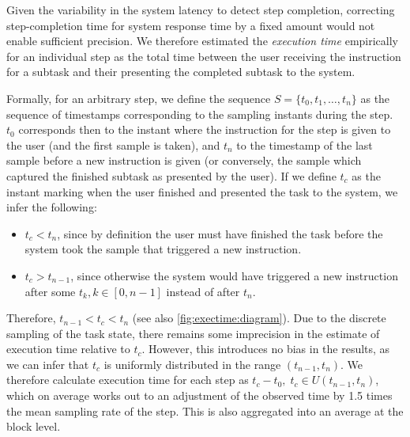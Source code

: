 \documentclass[10pt,letterpaper]{article}
\begin{document}
\begin{definition}

  Given the variability in the system latency to detect step completion, correcting step-completion time for system response time by a fixed amount would not enable sufficient precision.
  We therefore estimated the \emph{execution time} empirically for an individual step as the total time between the user receiving the instruction for a subtask and their presenting the completed subtask to the system.


  Formally, for an arbitrary step, we define the sequence \( S = \{ t_{0}, t_{1}, \ldots, t_{n} \} \) as the sequence of timestamps corresponding to the sampling instants during the step.
  \( t_{0} \) corresponds then to the instant where the instruction for the step is given to the user (and the first sample is taken), and \( t_{n} \) to the timestamp of the last sample before a new instruction is given (or conversely, the sample which captured the finished subtask as presented by the user).
  If we define \( t_{c} \) as the instant marking when the user finished and presented the task to the system, we infer the following:

  \begin{itemize}
    \item \( t_{c} < t_{n} \), since by definition the user must have finished the task before the system took the sample that triggered a new instruction.
    \item \( t_{c} > t_{n - 1} \), since otherwise the system would have triggered a new instruction after some \( t_{k}, k \in [0, n-1] \) instead of after \( t_{n} \).
  \end{itemize}

  Therefore, \( t_{n-1} < t_{c} < t_{n} \) (see also \cref{fig:exectime:diagram}).
  Due to the discrete sampling of the task state, there remains some imprecision in the estimate of execution time relative to \( t_{c} \).
  However, this introduces no bias in the results, as we can infer that \( t_{c} \) is uniformly distributed in the range \( (t_{n-1}, t_{n}) \).
  We therefore calculate execution time for each step as \( t_{c} - t_{0},\; t_{c} \in U(t_{n-1}, t_{n}) \), which on average works out to an adjustment of the observed time by 1.5 times the mean sampling rate of the step.
  This is also aggregated into an average at the block level.


\end{definition}
\end{document}
